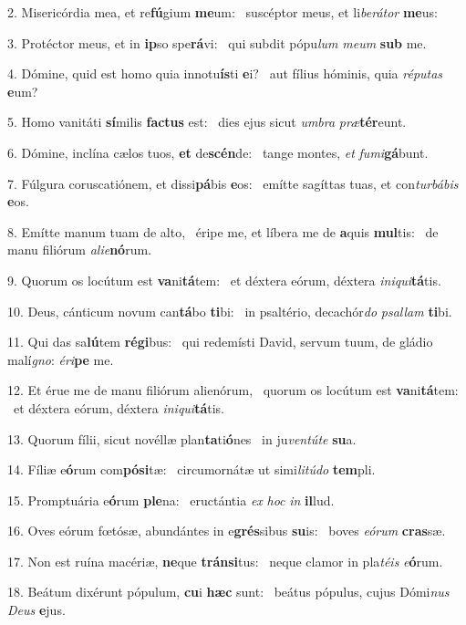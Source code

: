 2. Misericórdia mea, et re\textbf{fú}gium \textbf{me}um: \ast\  suscéptor meus, et li\textit{be}\textit{rá}\textit{tor} \textbf{me}us:\

3. Protéctor meus, et in \textbf{ip}so spe\textbf{rá}vi: \ast\  qui subdit pópu\textit{lum} \textit{me}\textit{um} \textbf{sub} me.\

4. Dómine, quid est homo quia innotu\textbf{ís}ti \textbf{e}i? \ast\  aut fílius hóminis, quia \textit{ré}\textit{pu}\textit{tas} \textbf{e}um?\

5. Homo vanitáti \textbf{sí}milis \textbf{fac}\textbf{tus} est: \ast\  dies ejus sicut \textit{um}\textit{bra} \textit{præ}\textbf{tér}eunt.\

6. Dómine, inclína cælos tuos, \textbf{et} de\textbf{scén}de: \ast\  tange montes, \textit{et} \textit{fu}\textit{mi}\textbf{gá}bunt.\

7. Fúlgura coruscatiónem, et dissi\textbf{pá}bis \textbf{e}os: \ast\  emítte sagíttas tuas, et con\textit{tur}\textit{bá}\textit{bis} \textbf{e}os.\

8. Emítte manum tuam de alto, \dag\  éripe me, et líbera me de \textbf{a}quis \textbf{mul}tis: \ast\  de manu filiórum \textit{a}\textit{li}\textit{e}\textbf{nó}rum.\

9. Quorum os locútum est \textbf{va}ni\textbf{tá}tem: \ast\  et déxtera eórum, déxtera \textit{in}\textit{i}\textit{qui}\textbf{tá}tis.\

10. Deus, cánticum novum can\textbf{tá}bo \textbf{ti}bi: \ast\  in psaltério, decachór\textit{do} \textit{psal}\textit{lam} \textbf{ti}bi.\

11. Qui das sa\textbf{lú}tem \textbf{ré}\textbf{gi}bus: \ast\  qui redemísti David, servum tuum, de gládio malí\textit{gno}: \textit{é}\textit{ri}\textbf{pe} me.\

12. Et érue me de manu filiórum alienórum, \dag\  quorum os locútum est \textbf{va}ni\textbf{tá}tem: \ast\  et déxtera eórum, déxtera \textit{in}\textit{i}\textit{qui}\textbf{tá}tis.\

13. Quorum fílii, sicut novéllæ plan\textbf{ta}ti\textbf{ó}nes \ast\  in ju\textit{ven}\textit{tú}\textit{te} \textbf{su}a.\

14. Fíliæ e\textbf{ó}rum com\textbf{pó}\textbf{si}tæ: \ast\  circumornátæ ut simi\textit{li}\textit{tú}\textit{do} \textbf{tem}pli.\

15. Promptuária e\textbf{ó}rum \textbf{ple}na: \ast\  eructántia \textit{ex} \textit{hoc} \textit{in} \textbf{il}lud.\

16. Oves eórum fœtósæ, abundántes in e\textbf{grés}sibus \textbf{su}is: \ast\  boves \textit{e}\textit{ó}\textit{rum} \textbf{cras}sæ.\

17. Non est ruína macériæ, \textbf{ne}que \textbf{tráns}\textbf{i}tus: \ast\  neque clamor in pla\textit{té}\textit{is} \textit{e}\textbf{ó}rum.\

18. Beátum dixérunt pópulum, \textbf{cu}i \textbf{hæc} sunt: \ast\  beátus pópulus, cujus Dómi\textit{nus} \textit{De}\textit{us} \textbf{e}jus.\

